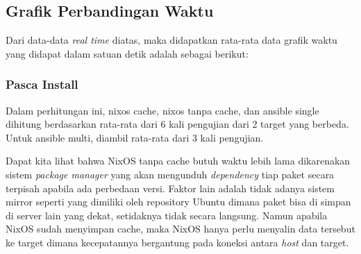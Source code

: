 \documentclass[10pt,]{report}
\begin{document}
\begin{adjustwidth}{20pt}{}
	\subsection{Grafik Perbandingan Waktu}
	\begin{adjustwidth}{20pt}{}
		Dari data-data \textit{real time} diatas, maka didapatkan
		rata-rata data grafik waktu yang didapat dalam satuan
		detik adalah sebagai berikut:
	\end{adjustwidth}
	\subsubsection{Pasca Install}
	\begin{adjustwidth}{20pt}{}
		Dalam perhitungan ini, nixos cache, nixos tanpa cache, dan ansible single
		dihitung berdasarkan rata-rata dari 6 kali pengujian dari 2 target yang berbeda.
		Untuk ansible multi, diambil rata-rata dari 3 kali pengujian.
	\end{adjustwidth}
  \begin{adjustwidth}{20pt}{}
    Dapat kita lihat bahwa NixOS tanpa cache butuh waktu lebih lama dikarenakan 
    sistem \textit{package manager} yang akan mengunduh \textit{dependency} tiap 
    paket secara terpisah apabila ada perbedaan versi. Faktor lain adalah 
    tidak adanya sistem mirror seperti yang dimiliki oleh 
    repository Ubuntu dimana paket bisa di simpan di server lain yang dekat, setidaknya
    tidak secara langsung.
    Namun apabila NixOS sudah menyimpan cache, maka NixOS hanya perlu menyalin 
    data tersebut ke target dimana kecepatannya bergantung pada koneksi antara 
    \textit{host} dan target. 
  \end{adjustwidth}

\end{adjustwidth}
\end{document}
